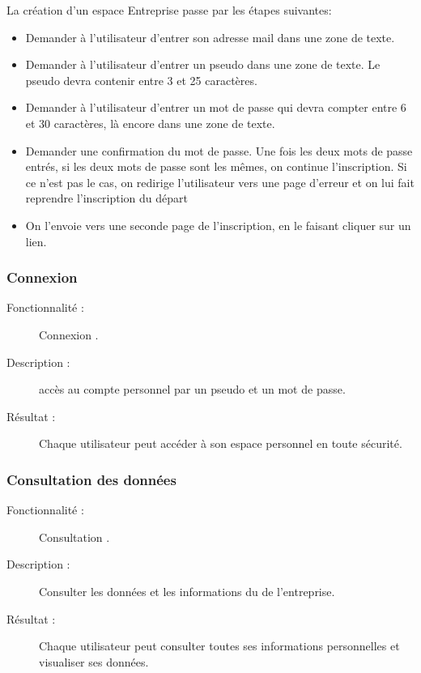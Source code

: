 \documentclass[12pt]{article}
\begin{document}
La création d'un espace Entreprise passe par les étapes suivantes:
\begin{itemize}


\item Demander à l'utilisateur d'entrer son adresse mail dans une zone de texte.
\item Demander à l'utilisateur d'entrer un pseudo dans une zone de texte.
Le pseudo devra contenir entre 3 et 25 caractères.
\item
Demander à l'utilisateur d'entrer un mot de passe qui devra compter entre 6 et 30 caractères, là encore dans une zone de
texte.
\item
Demander une confirmation du mot de passe.
Une fois les deux mots de passe entrés, si les deux mots de passe sont les
mêmes, on continue l'inscription.
Si ce n'est pas le cas, on redirige l'utilisateur vers une page d'erreur et on lui fait reprendre l'inscription du départ
\item
On l'envoie vers une seconde page de l'inscription, en le faisant cliquer sur un lien.

\end{itemize}



\subsubsection{Connexion}
\begin{description}


\item[Fonctionnalité :] Connexion .

\item[Description :]  accès au compte personnel par un pseudo et un mot de passe.

\item[Résultat :]  Chaque utilisateur peut accéder à
son espace personnel en toute sécurité.
\end{description}

\subsubsection{ Consultation des données}
\begin{description}

\item[Fonctionnalité :] Consultation .

\item[Description :]  Consulter les données et les informations du de l'entreprise.

\item[Résultat :]  Chaque utilisateur peut consulter toutes ses informations personnelles  et visualiser ses 
données.
\end{description}
\end{document}
